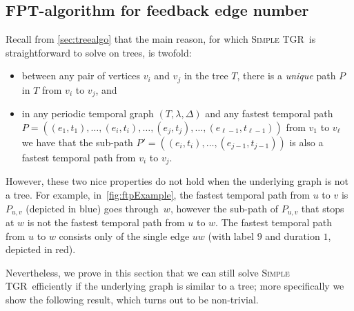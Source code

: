 \documentclass[a4paper,UKenglish,cleveref, autoref, thm-restate, anonymous]{lipics-v2021}
\newcommand{\deltaExact}{\textsc{Simple TGR}}
\begin{document}
\subsection{FPT-algorithm for feedback edge number}\label{sec:FPT}

Recall from \cref{sec:treealgo} that the main reason, for which \deltaExact\ is straightforward to solve on trees, is twofold: 
\begin{itemize}
    \item between any pair of vertices $v_i$ and $v_j$ in the tree $T$, there is a \emph{unique} path $P$ in $T$ from $v_i$ to $v_j$, and 
    \item in any periodic temporal graph $(T,\lambda,\Delta)$ and any fastest temporal path $P=((e_1,t_1),\ldots,(e_i,t_i),\ldots,(e_j,t_j),\ldots,(e_{\ell-1},t_{\ell-1}))$ from $v_1$ to $v_{\ell}$ we have that the sub-path $P'=((e_i,t_i),\ldots,(e_{j-1},t_{j-1}))$ is also a fastest temporal path from $v_i$ to $v_j$.
\end{itemize}
However, these two nice properties do not hold when the underlying graph is not a tree. For example, in~\cref{fig:ftpExample}, the fastest temporal path from $u$ to $v$ is $P_{u,v}$ (depicted in blue) goes through~$w$, however the sub-path of $P_{u,v}$ that stops at $w$ is not the fastest temporal path from $u$ to $w$. The fastest temporal path from $u$ to $w$ consists only of the single edge $uw$ (with label $9$ and duration $1$, depicted in red).

Nevertheless, we prove in this section that we can still solve \deltaExact\ efficiently if the underlying graph is similar to a tree; more specifically we show the following result, which turns out to be non-trivial.

\end{document}
